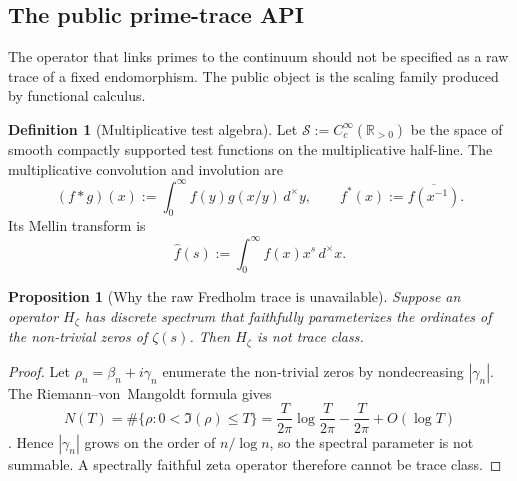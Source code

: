\documentclass[11pt,a4paper]{article}
\theoremstyle{plain}
\newtheorem{proposition}[theorem]{Proposition}
\theoremstyle{definition}
\newtheorem{definition}[theorem]{Definition}
\newcommand{\R}{\mathbb{R}}
\newcommand{\dmu}{d^{\times}}
\begin{document}
\subsection{The public prime-trace API}

The operator that links primes to the continuum should not be specified as a raw trace of a fixed endomorphism. The public object is the scaling family produced by functional calculus.

\begin{definition}[Multiplicative test algebra]
Let $\mathscr S:=C_c^{\infty}(\R_{>0})$ be the space of smooth compactly supported test functions on the multiplicative half-line. The multiplicative convolution and involution are
\[
  (f*g)(x):=\int_{0}^{\infty} f(y)g(x/y)\,\dmu y,
  \qquad
  f^{\ast}(x):=\overline{f(x^{-1})}.
\]
Its Mellin transform is
\[
  \widehat f(s):=\int_{0}^{\infty} f(x)x^s\,\dmu x.
\]
\end{definition}

\begin{proposition}[Why the raw Fredholm trace is unavailable]
\label{prop:nottraceclass}
Suppose an operator $H_{\zeta}$ has discrete spectrum that faithfully parameterizes the ordinates of the non-trivial zeros of $\zeta(s)$. Then $H_{\zeta}$ is not trace class.
\end{proposition}

\begin{proof}
Let $\rho_n=\beta_n+i\gamma_n$ enumerate the non-trivial zeros by nondecreasing $|\gamma_n|$. The Riemann--von~Mangoldt formula gives
\[
  N(T)=\#\{\rho:0<\Im(\rho)\le T\}
  =
  \frac{T}{2\pi}\log\frac{T}{2\pi}
  -\frac{T}{2\pi}
  +O(\log T)
\]
\citep{titchmarsh,bombieri-rh}. Hence $|\gamma_n|$ grows on the order of $n/\log n$, so the spectral parameter is not summable. A spectrally faithful zeta operator therefore cannot be trace class.
\end{proof}
\end{document}
